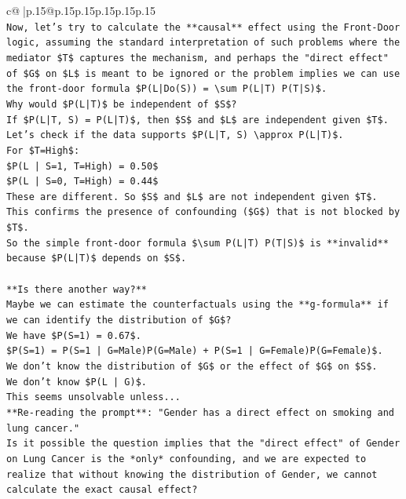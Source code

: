 \documentclass{article}
\begin{document}
{\begin{supertabular}{c@{$\;$}|p{.15\linewidth}@{}p{.15\linewidth}p{.15\linewidth}p{.15\linewidth}p{.15\linewidth}p{.15\linewidth}}
{{{\\ 
\texttt{Now, let's try to calculate the **causal** effect using the Front{-}Door logic, assuming the standard interpretation of such problems where the mediator \$T\$ captures the mechanism, and perhaps the "direct effect" of \$G\$ on \$L\$ is meant to be ignored or the problem implies we can use the front{-}door formula \$P(L|Do(S)) = \textbackslash{}sum P(L|T) P(T|S)\$.} \\
\texttt{Why would \$P(L|T)\$ be independent of \$S\$?} \\
\texttt{If \$P(L|T, S) = P(L|T)\$, then \$S\$ and \$L\$ are independent given \$T\$.} \\
\texttt{Let's check if the data supports \$P(L|T, S) \textbackslash{}approx P(L|T)\$.} \\
\texttt{For \$T=High\$:} \\
\texttt{\$P(L | S=1, T=High) = 0.50\$} \\
\texttt{\$P(L | S=0, T=High) = 0.44\$} \\
\texttt{These are different. So \$S\$ and \$L\$ are not independent given \$T\$. This confirms the presence of confounding (\$G\$) that is not blocked by \$T\$.} \\
\texttt{So the simple front{-}door formula \$\textbackslash{}sum P(L|T) P(T|S)\$ is **invalid** because \$P(L|T)\$ depends on \$S\$.} \\
\\ 
\texttt{**Is there another way?**} \\
\texttt{Maybe we can estimate the counterfactuals using the **g{-}formula** if we can identify the distribution of \$G\$?} \\
\texttt{We have \$P(S=1) = 0.67\$.} \\
\texttt{\$P(S=1) = P(S=1 | G=Male)P(G=Male) + P(S=1 | G=Female)P(G=Female)\$.} \\
\texttt{We don't know the distribution of \$G\$ or the effect of \$G\$ on \$S\$.} \\
\texttt{We don't know \$P(L | G)\$.} \\
\texttt{This seems unsolvable unless...} \\
\texttt{**Re{-}reading the prompt**: "Gender has a direct effect on smoking and lung cancer."} \\
\texttt{Is it possible the question implies that the "direct effect" of Gender on Lung Cancer is the *only* confounding, and we are expected to realize that without knowing the distribution of Gender, we cannot calculate the exact causal effect?} \\
}}}
\end{supertabular}}
\end{document}
